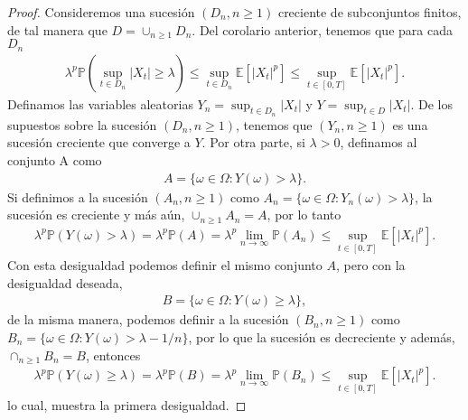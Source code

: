 \begin{proof}
	Consideremos una sucesión $(D_n, n \geq 1)$ creciente de subconjuntos finitos, de tal manera que $D = \cup_{n \geq 1} D_n$. Del corolario anterior, tenemos que para cada $D_n$
    \begin{align*}
	\lambda^p \mathbb{P} \left( \sup_{t \in D_n} |X_t| \geq \lambda \right) \leq \sup_{t \in D_n} \mathbb{E} \left[ |X_t|^p \right] \leq \sup_{t \in [0, T]} \mathbb{E} \left[ |X_t|^p \right].
	\end{align*}
    Definamos las variables aleatorias $Y_n = \sup_{t \in D_n} |X_t|$ y $Y = \sup_{t \in D} |X_t|$. De los supuestos sobre la sucesión $(D_n, n \geq 1)$, tenemos que $(Y_n, n \geq 1)$ es una sucesión creciente que converge a $Y$. Por otra parte, si $\lambda > 0$, definamos al conjunto A como
    \begin{align*}
	A = \{ \omega \in \Omega : Y(\omega) > \lambda \}.
	\end{align*}
    Si definimos a la sucesión $(A_n, n \geq 1)$ como $A_n = \{ \omega \in \Omega : Y_n(\omega) > \lambda \}$, la sucesión es creciente y más aún, $\cup_{n \geq 1} A_n = A$, por lo tanto
    \begin{align*}
	\lambda^p \mathbb{P} \left( Y(\omega) > \lambda \right) = \lambda^p \mathbb{P} (A) = \lambda^p \lim_{n \rightarrow \infty} \mathbb{P} (A_n) \leq \sup_{t \in [0, T]} \mathbb{E} \left[ |X_t|^p \right].
	\end{align*}
    Con esta desigualdad podemos definir el mismo conjunto $A$, pero con la desigualdad deseada, 
    \begin{align*}
	B = \{ \omega \in \Omega : Y(\omega) \geq \lambda \},
	\end{align*}
    de la misma manera, podemos definir a la sucesión $(B_n, n \geq 1)$ como $B_n = \{ \omega \in \Omega : Y(\omega) > \lambda - 1/n \}$, por lo que la sucesión es decreciente y además, $\cap_{n \geq 1} B_n = B$, entonces
    \begin{align*}
	\lambda^p \mathbb{P} \left( Y(\omega) \geq \lambda \right) = \lambda^p \mathbb{P} (B) = \lambda^p \lim_{n \rightarrow \infty} \mathbb{P} (B_n) \leq \sup_{t \in [0, T]} \mathbb{E} \left[ |X_t|^p \right].
	\end{align*}    
    lo cual, muestra la primera desigualdad.
    

\end{proof}
